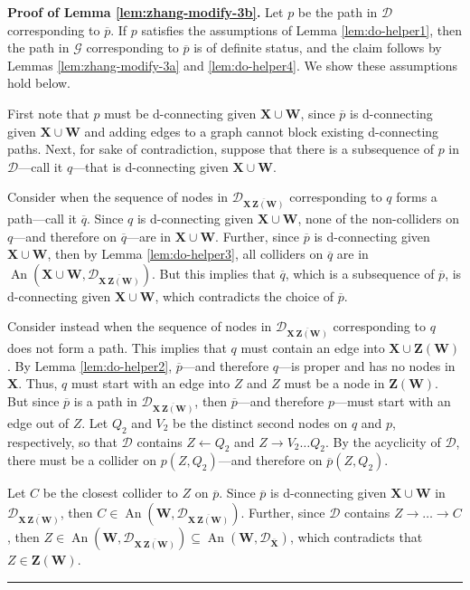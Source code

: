 \documentclass[11pt]{article}
\DeclareMathOperator{\An}{An}
\newcommand{\BlackBox}{\rule{1.5ex}{1.5ex}}  %
\newcommand{\mb}[1]{\mathbf{#1}}
\newcommand{\g}[1][G]{\mathcal{#1}}
\newenvironment{proofof}[1][]{\noindent \textbf{Proof of #1.}}{\hfill\BlackBox}
\begin{document}
\begin{proofof}[Lemma \ref{lem:zhang-modify-3b}]
    Let $p$ be the path in $\g[D]$ corresponding to $\overline{p}$. If $p$ satisfies the assumptions of Lemma \ref{lem:do-helper1}, then the path in $\g$ corresponding to $\overline{p}$ is of definite status, and the claim follows by Lemmas \ref{lem:zhang-modify-3a} and \ref{lem:do-helper4}. We show these assumptions hold below.

    First note that $p$ must be d-connecting given $\mb{X} \cup \mb{W}$, since $\overline{p}$ is d-connecting given $\mb{X} \cup \mb{W}$ and adding edges to a graph cannot block existing d-connecting paths. Next, for sake of contradiction, suppose that there is a subsequence of $p$ in $\g[D]$---call it $q$---that is d-connecting given $\mb{X} \cup \mb{W}$. 

    Consider when the sequence of nodes in $\g[D]_{\overline{\mb{X \, Z(W)}}}$ corresponding to $q$ forms a path---call it $\overline{q}$. Since $q$ is d-connecting given $\mb{X} \cup \mb{W}$, none of the non-colliders on $q$---and therefore on $\overline{q}$---are in $\mb{X} \cup \mb{W}$. Further, since $\overline{p}$ is d-connecting given $\mb{X} \cup \mb{W}$, then by Lemma \ref{lem:do-helper3}, all colliders on $\overline{q}$ are in $\An(\mb{X} \cup \mb{W}, \g[D]_{\overline{\mb{X \, Z(W)}}})$. But this implies that $\overline{q}$, which is a subsequence of $\overline{p}$, is d-connecting given $\mb{X} \cup \mb{W}$, which contradicts the choice of $\overline{p}$.

    Consider instead when the sequence of nodes in $\g[D]_{\overline{\mb{X \, Z(W)}}}$ corresponding to $q$ does not form a path. This implies that $q$ must contain an edge into $\mb{X} \cup \mb{Z(W)}$. By Lemma \ref{lem:do-helper2}, $\overline{p}$---and therefore $q$---is proper and has no nodes in $\mb{X}$. Thus, $q$ must start with an edge into $Z$ and $Z$ must be a node in $\mb{Z(W)}$. But since $\overline{p}$ is a path in $\g[D]_{\overline{\mb{X \, Z(W)}}}$, then $\overline{p}$---and therefore $p$---must start with an edge out of $Z$. Let $Q_2$ and $V_2$ be the distinct second nodes on $q$ and $p$, respectively, so that $\g[D]$ contains $Z \gets Q_2$ and $Z \to V_2 \dots Q_2$. By the acyclicity of $\g[D]$, there must be a collider on $p(Z, Q_2)$---and therefore on $\overline{p}(Z, Q_2)$. 
    
    Let $C$ be the closest collider to $Z$ on $\overline{p}$. Since $\overline{p}$ is d-connecting given $\mb{X} \cup \mb{W}$ in $\g[D]_{\overline{\mb{X \, Z(W)}}}$, then $C \in \An(\mb{W},\g[D]_{\overline{\mb{X \, Z(W)}}})$. Further, since $\g[D]$ contains $Z \to \dots \to C$, then $Z \in \An(\mb{W},\g[D]_{\overline{\mb{X \, Z(W)}}}) \subseteq \An(\mb{W}, \g[D]_{\overline{\mb{X}}})$, which contradicts that $Z \in \mb{Z(W)}$.
\end{proofof}
\end{document}
